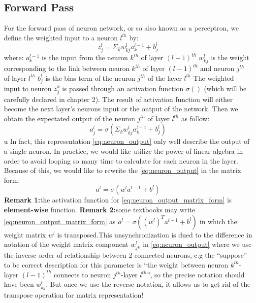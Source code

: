\subsection{Forward Pass}
For the forward pass of neuron network, or so also known as a perceptron, we define the weighted input to a neuron $l^{th}$ by:
\begin{equation}
	z^{l}_{j} = \Sigma_{k} w^{l}_{kj}a^{l-1}_{k} + b^{l}_{j}
\end{equation}
where:\newline
$a^{l-1}_{k}$ is the input from the neuron $k^{th}$ of layer $(l-1)^{th}$\newline
$w^{l}_{kj}$ is the weight corresponding to the link between neuron $k^{th}$ of layer $(l-1)^{th}$ and neuron $j^{th}$ of layer $l^{th}$\newline
$b^{l}_{j}$ is the bias term of the neuron $j^{th}$ of the layer $l^{th}$\newline
\newline
The weighted input to neuron $z^{k}_{j}$ is passed through an activation function $\sigma()$ (which will be carefully declared in chapter 2). The result of activation function will either become the next layer's neurons input or the output of the network. Then we obtain the expectated output of the neuron $j^{th}$ of layer $l^{th}$ as follow:
\begin{equation}\label{eq:neuron_output}
	a^{l}_{j} = \sigma\left(\Sigma_{k} w^{l}_{kj}a^{l-1}_{k} + b^{l}_{j}\right)
\end{equation}
u
In fact, this representation \eqref{eq:neuron_output} only well describe the output of a single neuron. In practice, we would like utilize the power of linear algebra in order to avoid looping so many time to calculate for each neuron in the layer. Because of this, we would like to rewrite the \eqref{eq:neuron_output} in the matrix form:
\begin{equation}\label{eq:neuron_output_matrix_form}
	a^{l} = \sigma\left(w^{l}a^{l-1} + b^{l}\right)
\end{equation}
\textbf{Remark 1:}the activation function for \eqref{eq:neuron_output_matrix_form} is \textbf{element-wise} function.\newline\noindent
\textbf{Remark 2:}some textbooks may write \eqref{eq:neuron_output_matrix_form} as $a^{l} = \sigma\left((w^{l})^{T}a^{l-1} + b^{l}\right)$ in which the weight matrix $w^{l}$ is transposed.This unsynchronization is dued to the difference in notation of the weight matrix component $w^{l}_{jk}$ in \eqref{eq:neuron_output} where we use the inverse order of relationship between 2 connected neurons, e.g the ``suppose'' to be correct description for this parameter is ``the weight between neuron $k^{th}$-layer $(l-1)^{th}$ connects to neuron $j^{th}$-layer $l^{th}$'', so the precise notation should have been \textbf{$w^{l}_{kj}$}. But once we use the reverse notation, it allows us to get rid of the transpose operation for matrix representation!

